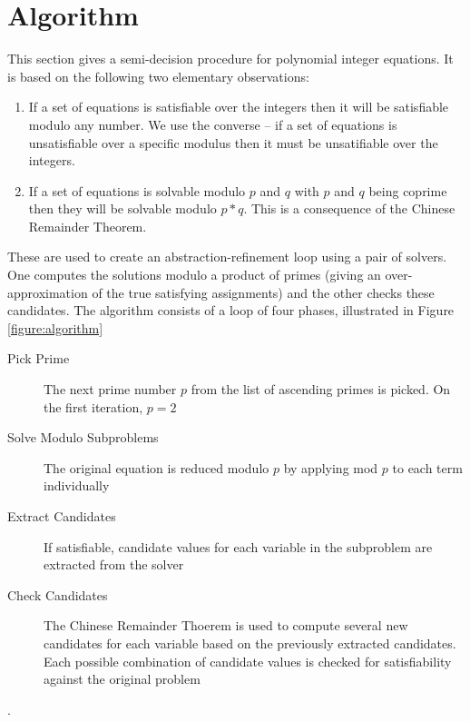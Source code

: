 \section{Algorithm}
\label{section:algorithm}

This section gives a semi-decision procedure for polynomial integer
equations.
%
It is based on the following two elementary observations:
%
\begin{enumerate}
\item{If a set of equations is satisfiable over the integers then it
  will be satisfiable modulo any number.  We use the converse -- if a
  set of equations is unsatisfiable over a specific modulus then it
  must be unsatifiable over the integers.}
\item{If a set of equations is solvable modulo $p$ and $q$ with $p$ and
  $q$ being coprime then they will be solvable modulo $p*q$.  This is a
  consequence of the Chinese Remainder Theorem.}
\end{enumerate}
%
These are used to create an abstraction-refinement loop using a pair
of solvers.  One computes the solutions modulo a product of primes
(giving an over-approximation of the true satisfying assignments) and
the other checks these candidates.
%
The algorithm consists of a loop of four phases, illustrated in Figure
\ref{figure:algorithm}

\begin{description}
  \item[Pick Prime]{The next prime number $p$ from the list of
  ascending primes is picked. On the first iteration, $p = 2$}
  \item[Solve Modulo Subproblems]{The original equation is reduced modulo 
  $p$ by applying mod $p$ to each term individually}
  \item[Extract Candidates]{If satisfiable, candidate values for each variable 
  in the subproblem are extracted from the solver}
  \item[Check Candidates]{The Chinese Remainder Thoerem is used to compute
  several new candidates for each variable based on the previously extracted 
  candidates. Each possible combination of candidate values is checked for 
  satisfiability against the original problem}
\end{description}

\begin{figure*}
  \caption{A semi-decision procedure for polynomial integer equations.}
  \label{figure:algorithm}.
\end{figure*}



